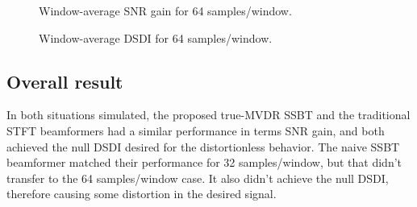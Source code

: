 

%	
%	

\begin{figure}[H]
\centering

\caption{Window-average SNR gain for 64 samples/window.}
\label{fig:lineplot_gain_64}
\end{figure}

\begin{figure}[H]
	\centering
	
	\caption{Window-average DSDI for 64 samples/window.}
	\label{fig:lineplot_dsdi_64}
\end{figure}

\subsection{Overall result}

In both situations simulated, the proposed true-MVDR SSBT and the traditional STFT beamformers had a similar performance in terms SNR gain, and both achieved the null DSDI desired for the distortionless behavior. The naive SSBT beamformer matched their performance for 32 samples/window, but that didn't transfer to the 64 samples/window case. It also didn't achieve the null DSDI, therefore causing some distortion in the desired signal.